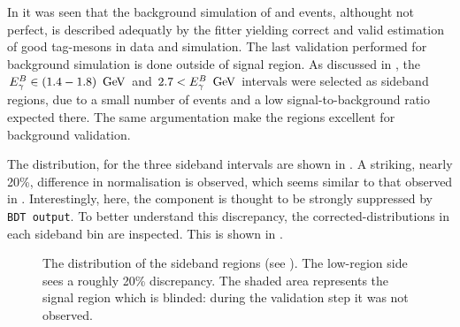 In  it was seen that the background simulation of \qqbar and \BB events,
althought not perfect, is described adequatly by the \Mbc fitter yielding correct and valid estimation of good tag-\B mesons in data and simulation.
The last validation performed for background simulation is done outside of \EB signal region.
As discussed in , the ${E^B_{\gamma}}\in(1.4-1.8)~\mathrm{\,Ge\kern -0.1em V}$ and $2.7<{E^B_{\gamma}}~\mathrm{\,Ge\kern -0.1em V}$ intervals were selected as sideband regions, 
due to a small number of \BtoXsgamma events and a low signal-to-background ratio expected there.
The same argumentation make the regions excellent for background validation.

The \EB distribution, for the three \EB sideband intervals are shown in .
A striking, nearly 20\%, difference in normalisation is observed, 
which seems similar to that observed in .
Interestingly, here, the \epem\ra\qqbar component is thought to be strongly suppressed by \texttt{BDT~output}.
To better understand this discrepancy, the corrected-\Mbc distributions in each \EB sideband bin are inspected.
This is shown in .
\begin{figure}[htbp!]
    \centering
    \caption{\label{fig:sidebands_eb} 
    The \EB distribution of the \EB sideband regions (see ).
    The low-\EB region side sees a roughly 20\% discrepancy.
    The shaded area represents the signal region which is blinded: during the validation step it was not observed.
    }
\end{figure}
